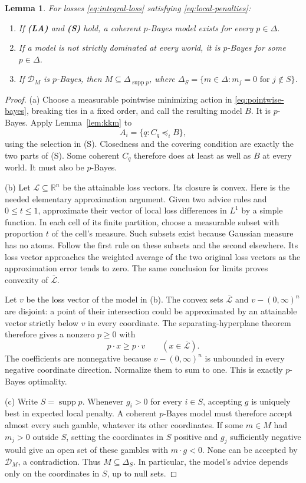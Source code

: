 \documentclass[11pt]{article}
\newtheorem{lemma}[theorem]{Lemma}
\theoremstyle{remark}
\newcommand{\R}{\mathbb R}
\newcommand{\Dscr}{\mathcal D}
\newcommand{\supp}{\operatorname{supp}}
\begin{document}
\begin{lemma}\label{lem:bayes-necessary}
For losses \eqref{eq:integral-loss} satisfying
\eqref{eq:local-penalties}:
\begin{enumerate}[label=(\alph*)]
\item If \textbf{(LA)} and \textbf{(S)} hold, a coherent $p$-Bayes model
exists for every $p\in\Delta$.
\item If a model is not strictly dominated at every world, it is $p$-Bayes
for some $p\in\Delta$.
\item If $\Dscr_M$ is $p$-Bayes, then $M\subseteq\Delta_{\supp p}$, where
$\Delta_S=\{m\in\Delta:m_j=0\text{ for }j\notin S\}$.
\end{enumerate}
\end{lemma}
\begin{proof}
(a) Choose a measurable pointwise minimizing action in
\eqref{eq:pointwise-bayes}, breaking ties in a fixed order, and call the
resulting model $B$. It is $p$-Bayes. Apply Lemma~\ref{lem:kkm} to
\[
 A_i=\{q:C_q\preceq_i B\},
\]
using the selection in (S). Closedness and the covering condition are
exactly the two parts of (S). Some coherent $C_q$ therefore does at least
as well as $B$ at every world. It must also be $p$-Bayes.

(b) Let $\mathcal L\subseteq\R^n$ be the attainable loss vectors. Its closure
is convex. Here is the needed elementary approximation argument. Given
two advice rules and $0\le t\le1$, approximate their vector of local loss
differences in $L^1$ by a simple function. In each cell of its finite
partition, choose a measurable subset with proportion $t$ of the cell's
measure. Such subsets exist because Gaussian measure has no atoms. Follow
the first rule on these subsets and the second elsewhere. Its loss vector
approaches the weighted average of the two original loss vectors as the
approximation error tends to zero. The same conclusion for limits proves
convexity of $\overline{\mathcal L}$.

Let $v$ be the loss vector of the model in (b).
The convex sets $\overline{\mathcal L}$ and $v-(0,\infty)^n$ are disjoint:
a point of their intersection could be approximated by an attainable vector
strictly below $v$ in every coordinate. The separating-hyperplane theorem
therefore gives a nonzero $p\ge0$ with
\[
 p\cdot x\ge p\cdot v\qquad(x\in\overline{\mathcal L}).
\]
The coefficients are nonnegative because $v-(0,\infty)^n$ is unbounded in
every negative coordinate direction. Normalize them to sum to one. This
is exactly $p$-Bayes optimality.

(c) Write $S=\supp p$. Whenever $g_i>0$ for every $i\in S$, accepting $g$
is uniquely best in expected local penalty. A coherent $p$-Bayes model must
therefore accept almost every such gamble, whatever its other coordinates.
If some $m\in M$ had $m_j>0$ outside $S$, setting the coordinates in $S$
positive and $g_j$ sufficiently negative would give an open set of these
gambles with $m\cdot g<0$. None can be accepted by $\Dscr_M$, a contradiction.
Thus $M\subseteq\Delta_S$. In particular, the model's advice depends only
on the coordinates in $S$, up to null sets.
\end{proof}
\end{document}

